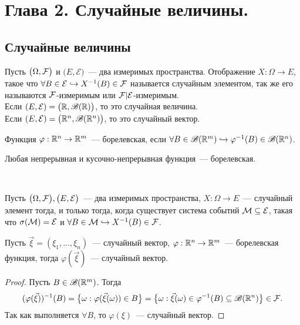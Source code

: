 \section{Глава 2. Случайные величины.}
\subsection{Случайные величины}
\begin{definition}
	Пусть $\big(\Omega, \mathcal{F} \big)$ и $\big( E, \mathcal{E} \big)$~--- два измеримых пространства. Отображение $X: \Omega \rightarrow E$, такое что $\forall B \in \mathcal{E} \hookrightarrow X^{-1}(B) \in \mathcal{F}$  называется случайным элементом, так же его называются $\mathcal{F}$-измеримым или $\mathcal{F}|\mathcal{E}$-измеримым. \\
	Если $(E, \mathcal{E}) = \big(\mathbb{R}, \mathscr{B}(\mathbb{R})\big)$, то это случайная величина. \\
	Если $(E, \mathcal{E}) = \big(\mathbb{R}^n, \mathscr{B}(\mathbb{R}^n)\big)$, то это случайный вектор.
\end{definition}

\begin{definition}
	Функция $\varphi: \mathbb{R}^n \rightarrow \mathbb{R}^m$~--- борелевская, если $\forall B \in \mathscr{B}(\mathbb{R}^m) \hookrightarrow \varphi^{-1}(B) \in \mathscr{B}(\mathbb{R}^n)$. 
\end{definition}

\begin{statement}
	Любая непрерывная и кусочно-непрерывная функция~--- борелевская.
\end{statement}

\begin{theorem}~

	Пусть $\big(\Omega, \mathcal{F}\big), \big(E, \mathcal{E}\big)$~--- два измеримых пространства, $X: \Omega \rightarrow E$~--- случайный элемент тогда, и только тогда, когда существует система событий $\mathcal{M} \subseteq \mathcal{E}$, такая что $\sigma(\mathcal{M}) = \mathcal{E}$ и $\forall B \in \mathcal{M} \hookrightarrow X^{-1}(B) \in \mathcal{F}$.
\end{theorem}

\begin{lemma}
	Пусть $\vec\xi = (\xi_1, \ldots, \xi_n)$~--- случайный вектор, $\varphi: \mathbb{R}^n \rightarrow \mathbb{R}^m$~--- борелевская функция, тогда $\varphi(\vec\xi)$~--- случайный вектор.
	\begin{proof}
		Пусть $B \in \mathscr{B}(\mathbb{R}^m)$. Тогда 
		$$ (\varphi(\vec\xi))^{-1}(B) = \big\{\omega : \varphi(\vec\xi(\omega)) \in B\big\} = \big\{\omega : \vec\xi(\omega) \in \varphi^{-1}(B) \subseteq \mathscr{B}(\mathbb{R}^n) \big\} \in \mathcal{F}. $$ Так как выполняется $\forall B$, то $\varphi(\xi)$~--- случайный вектор.
	\end{proof}
\end{lemma}

